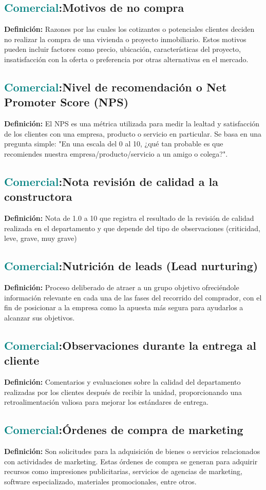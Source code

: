 \documentclass[12pt]{article}
\begin{document}
\subsection{\textcolor{teal}{Comercial}:{Motivos de no compra}}
\textbf{Definición:} Razones por las cuales los cotizantes o potenciales clientes deciden no realizar la compra de una vivienda o proyecto inmobiliario. Estos motivos pueden incluir factores como precio, ubicación, características del proyecto, insatisfacción con la oferta o preferencia por otras alternativas en el mercado.
\subsection{\textcolor{teal}{Comercial}:{Nivel de recomendación o Net Promoter Score (NPS)}}
\textbf{Definición:} El NPS es una métrica utilizada para medir la lealtad y satisfacción de los clientes con una empresa, producto o servicio en particular. Se basa en una pregunta simple: "En una escala del 0 al 10, ¿qué tan probable es que recomiendes nuestra empresa/producto/servicio a un amigo o colega?".
\subsection{\textcolor{teal}{Comercial}:{Nota revisión de calidad a la constructora}}
\textbf{Definición:} Nota de 1.0 a 10 que registra el resultado de la revisión de calidad realizada en el departamento y que depende del tipo de observaciones (criticidad, leve, grave, muy grave)
\subsection{\textcolor{teal}{Comercial}:{Nutrición de leads (Lead nurturing)}}
\textbf{Definición:} Proceso deliberado de atraer a un grupo objetivo ofreciéndole información relevante en cada una de las fases del recorrido del comprador, con el fin de posicionar a la empresa como la apuesta más segura para ayudarlos a alcanzar sus objetivos.
\subsection{\textcolor{teal}{Comercial}:{Observaciones durante la entrega al cliente}}
\textbf{Definición:} Comentarios y evaluaciones sobre la calidad del departamento realizadas por los clientes después de recibir la unidad, proporcionando una retroalimentación valiosa para mejorar los estándares de entrega.
\subsection{\textcolor{teal}{Comercial}:{Órdenes de compra de marketing}}
\textbf{Definición:} Son solicitudes para la adquisición de bienes o servicios relacionados con actividades de marketing. Estas órdenes de compra se generan para adquirir recursos como impresiones publicitarias, servicios de agencias de marketing, software especializado, materiales promocionales, entre otros.
\end{document}
